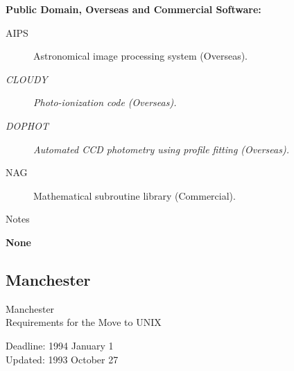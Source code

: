 \newpage
\vspace{5mm}
\begin{center}
{\bf Public Domain, Overseas and Commercial Software:}
\end{center}

\begin{description}
\item[AIPS] Astronomical image processing system (Overseas).
\item[{\em CLOUDY}] {\em Photo-ionization code (Overseas).}
\item[{\em DOPHOT}] {\em Automated CCD photometry using profile fitting
(Overseas).}
\item[NAG] Mathematical subroutine library (Commercial).
\end{description}


\vspace{5mm}
\begin{center}
{\large\sc Notes}
\end{center}

{\bf None}


\newpage
\subsection{Manchester}

\renewcommand{\starsitename}{Manchester}
\renewcommand{\starnodename}{MAVAD}

\renewcommand{\starunixdate}{1994 January 1}
\renewcommand{\starupdate}{1993 October 27}

\renewcommand{\starsitetelephone}{061 275 4236}
\renewcommand{\starsitefax}{061 273 4223}

\begin{center}
{\Large\sc \starsitename \\ [2ex]
           Requirements for the Move to UNIX}

\vspace{3mm}
{\large\sc Deadline: \starunixdate \\ [1ex]
           Updated: \starupdate}
\end{center}

\vspace{5mm}

